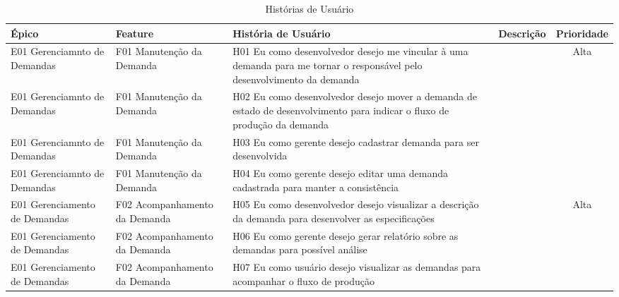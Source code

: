 \begin{table}[H]
	\begin{turn}{90}
		\begin{tabular}{|>{\centering}p{4cm}|>{\centering}p{4cm}|>{\centering}p{6cm}|>{\centering}p{6cm}|c|}
			\hline 
			Épico & Feature & História de Usuário & Descrição & Prioridade\tabularnewline
			\hline 
			\hline 
			E01 Gerenciamnto de Demandas & F01 Manutenção da Demanda & H01 Eu como desenvolvedor desejo me vincular à uma demanda para me tornar
			o responsável pelo desenvolvimento da demanda &  & Alta\tabularnewline
			\hline 
			E01 Gerenciamnto de Demandas & F01 Manutenção da Demanda & H02 Eu como desenvolvedor desejo mover a demanda de estado de desenvolvimento
			para indicar o fluxo de produção da demanda &  & \tabularnewline
			\hline 
			E01 Gerenciamnto de Demandas & F01 Manutenção da Demanda & H03 Eu como gerente desejo cadastrar demanda para ser desenvolvida &  & \tabularnewline
			\hline 
			E01 Gerenciamnto de Demandas & F01 Manutenção da Demanda & H04 Eu como gerente desejo editar uma demanda cadastrada para manter a
			consistência &  & \tabularnewline
			\hline 
			E01 Gerenciamento de Demandas & F02 Acompanhamento da Demanda & H05 Eu como desenvolvedor desejo visualizar a descrição da demanda para
			desenvolver as especificações &  & Alta\tabularnewline
			\hline 
			E01 Gerenciamento de Demandas & F02 Acompanhamento da Demanda & H06 Eu como gerente desejo gerar relatório sobre as demandas para possível
			análise &  & \tabularnewline
			\hline 
			E01 Gerenciamento de Demandas & F02 Acompanhamento da Demanda & H07 Eu como usuário desejo visualizar as demandas para acompanhar o fluxo
			de produção &  & \tabularnewline
			\hline 
		\end{tabular}
	\end{turn}
	\caption{Histórias de Usuário}
	\label{Historias1}
\end{table}


